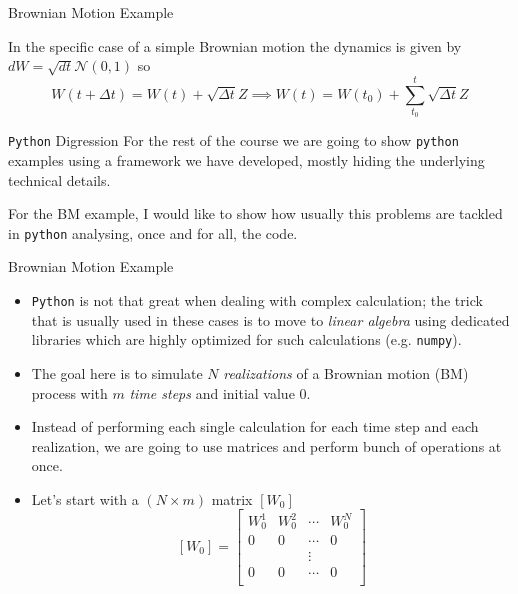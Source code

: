 \documentclass{beamer}
\begin{document}
\begin{frame}[fragile]{Brownian Motion Example}

In the specific case of a simple Brownian motion the dynamics is given by $dW = \sqrt{dt}\mathcal{N}(0,1)$ so
\begin{equation}
W(t+\Delta t) = W(t) + \sqrt{\Delta t}Z \implies
W(t) = W(t_0) + \sum_{t_0}^{t} \sqrt{\Delta t}Z
\label{eq:bm_evolution}
\end{equation}

\begin{block}{\texttt{Python} Digression}
For the rest of the course we are going to show \texttt{python} examples using a framework we have developed, mostly hiding the underlying technical details.

For the BM example, I would like to show how usually this problems are tackled in \texttt{python} analysing, once and for all, the code.
\end{block}
\end{frame}

\begin{frame}{Brownian Motion Example}
\begin{itemize}
    \item \texttt{Python} is not that great when dealing with complex calculation; the trick that is usually used in these cases is to move to \emph{linear algebra} using dedicated libraries which are highly optimized for such calculations (e.g. \texttt{numpy}).
    \item The goal here is to simulate $N$ \emph{realizations} of a Brownian motion (BM) process with $m$ \textit{time steps} and initial value 0. 
    \item Instead of performing each single calculation for each time step and each realization, we are going to use matrices and perform bunch of operations at once.
    \item Let's start with a $(N\times m)$ matrix $[W_0]$
    $$
    [W_0] =
    \begin{bmatrix}
    W^1_0 & W^2_0 & \cdots & W^N_0 \\
    0 & 0 & \cdots & 0 \\
     &  & \vdots &   \\
    0 & 0 & \cdots & 0 \\
    \end{bmatrix}
    $$
    \end{itemize}
\end{frame}
\end{document}
